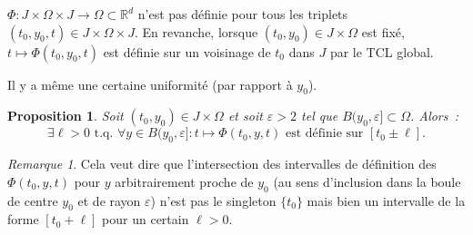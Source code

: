 \documentclass{report}
\newtheorem{prp}[thm]{Proposition}
\theoremstyle{definition}
\theoremstyle{remark}
\newtheorem*{rmq}{Remarque}
\numberwithin{equation}{section}
\newcommand{\R}{\mathbb R}
\newcommand{\tq}{\text{ t.q. }}
\begin{document}
			$\Phi : J \times \Omega \times J \to \Omega \subset \R^d$ n'est pas définie pour tous les triplets $(t_0, y_0, t) \in J \times \Omega \times J$.
			En revanche, lorsque $(t_0, y_0) \in J \times \Omega$ est fixé, $t \mapsto \Phi(t_0, y_0, t)$ est définie sur un voisinage de $t_0$ dans $J$
			par le TCL global.

			Il y a même une certaine uniformité (par rapport à $y_0$).

			\begin{prp} Soit $(t_0, y_0) \in J \times \Omega$ et soit $\varepsilon > 2$ tel que $B(y_0, \varepsilon] \subset \Omega$. Alors~:
			\begin{equation}
				\exists \ell > 0 \tq \forall y \in B(y_0, \varepsilon] : t \mapsto \Phi(t_0, y, t) \text{ est définie sur } [t_0 \pm \ell].
			\end{equation}
			\end{prp}

			\begin{rmq} Cela veut dire que l'intersection des intervalles de définition des $\Phi(t_0, y, t)$ pour $y$ arbitrairement proche de $y_0$ (au sens
			d'inclusion dans la boule de centre $y_0$ et de rayon $\varepsilon$) n'est pas le singleton $\{t_0\}$ mais bien un intervalle de la forme $[t_0+\ell]$
			pour un certain $\ell > 0$.
			\end{rmq}
\end{document}
